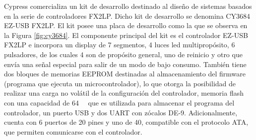 Cypress comercializa un kit de desarrollo destinado al diseño de sistemas basados en la serie de controladores FX2LP. Dicho kit de desarrollo se denomina CY3684 EZ-USB FX2LP. El kit posee una placa de desarrollo como la que se observa en la Figura \ref{fig:cy3684}. El componente principal del kit es el controlador EZ-USB FX2LP e incorpora un display de 7 segmentos, 4 luces led multipropósito, 6 pulsadores, de los cuales 4 son de propósito general, uno de reinicio y otro que envía una señal especial para salir de un modo de bajo consumo. También tiene dos bloques de memorias EEPROM destinadas al almacenamiento del firmware (programa que ejecuta un microcontrolador), lo que otorga la posibilidad de realizar una carga no volátil de la configuración del controlador, memoria flash con una capacidad de \SI{64}{\kilo\byte} que es utilizada para almacenar el programa del controlador, un puerto USB y dos UART con zócalos DE-9. Adicionalmente, cuenta con 6 puertos de 20 pines y uno de 40, compatible con el protocolo ATA, que permiten comunicarse con el controlador.
 


